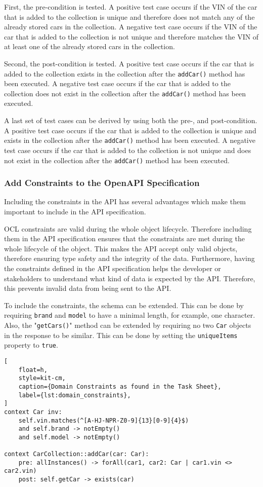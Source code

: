 First, the pre-condition is tested.
A positive test case occurs if the VIN of the car that is added to the collection is unique and therefore does not match any of the already stored cars in the collection.
A negative test case occurs if the VIN of the car that is added to the collection is not unique and therefore matches the VIN of at least one of the already stored cars in the collection.

Second, the post-condition is tested.
A positive test case occurs if the car that is added to the collection exists in the collection after the \texttt{addCar()} method has been executed.
A negative test case occurs if the car that is added to the collection does not exist in the collection after the \texttt{addCar()} method has been executed.

A last set of test cases can be derived by using both the pre-, and post-condition.
A positive test case occurs if the car that is added to the collection is unique and exists in the collection after the \texttt{addCar()} method has been executed.
A negative test case occurs if the car that is added to the collection is not unique and does not exist in the collection after the \texttt{addCar()} method has been executed.

\subsubsection*{Add Constraints to the OpenAPI Specification}
Including the constraints in the API has several advantages which make them important to include in the API specification.

OCL constraints are valid during the whole object lifecycle.
Therefore including them in the API specification ensures that the constraints are met during the whole lifecycle of the object.
This makes the API accept only valid objects, therefore ensuring type safety and the integrity of the data.
Furthermore, having the constraints defined in the API specification helps the developer or stakeholders to understand what kind of data is expected by the API.
Therefore, this prevents invalid data from being sent to the API.

To include the constraints, the schema can be extended.
This can be done by requiring \texttt{brand} and \texttt{model} to have a minimal length, for example, one character.
Also, the "\texttt{getCars()}" method can be extended by requiring no two \texttt{Car} objects in the response to be similar.
This can be done by setting the \texttt{uniqueItems} property to \texttt{true}.

\begin{lstlisting}[
    float=h,
    style=kit-cm,
    caption={Domain Constraints as found in the Task Sheet},
    label={lst:domain_constraints}, 
]
context Car inv:
    self.vin.matches(^[A-HJ-NPR-Z0-9]{13}[0-9]{4}$)
    and self.brand -> notEmpty()
    and self.model -> notEmpty()

context CarCollection::addCar(car: Car):
    pre: allInstances() -> forAll(car1, car2: Car | car1.vin <> car2.vin)
    post: self.getCar -> exists(car)
\end{lstlisting}